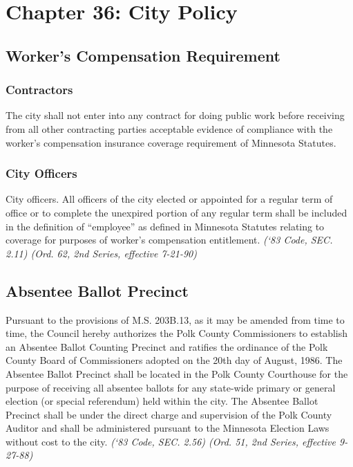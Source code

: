 %
\chapter*{Chapter 36: \newline
	City Policy}

\section{Worker's Compensation Requirement}
\subsection{Contractors}
The city shall not enter into any contract for doing public work before receiving from all other contracting parties acceptable evidence of compliance with the worker’s compensation insurance coverage requirement of Minnesota Statutes.
\subsection{City Officers}
City officers.  All officers of the city elected or appointed for a regular term of office or to complete the unexpired portion of any regular term shall be included in the definition of “employee” as defined in Minnesota Statutes relating to coverage for purposes of worker’s compensation entitlement.\newline
\emph{(‘83 Code, SEC. 2.11)  (Ord. 62, 2nd Series, effective 7-21-90)}

\section{Absentee Ballot Precinct}
Pursuant to the provisions of M.S. \textsection 203B.13, as it may be amended from time to time, the Council hereby authorizes the Polk County Commissioners to establish an Absentee Ballot Counting Precinct and ratifies the ordinance of the Polk County Board of Commissioners adopted on the 20th day of August, 1986.  The Absentee Ballot Precinct shall be located in the Polk County Courthouse for the purpose of receiving all absentee ballots for any state-wide primary or general election (or special referendum) held within the city.  The Absentee Ballot Precinct shall be under the direct charge and supervision of the Polk County Auditor and shall be administered pursuant to the Minnesota Election Laws without cost to the city.\newline
\emph{(‘83 Code, SEC. 2.56)  (Ord. 51, 2nd Series, effective 9-27-88)}

